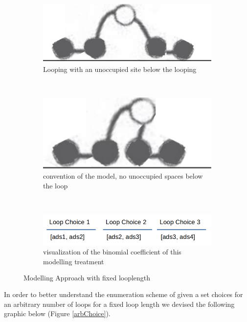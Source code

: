 \documentclass[10pt,letterpaper]{article}
\begin{document}
\begin{figure}[H]
	\centering
	\begin{subfigure}[b]{0.65\textwidth}
		\centering
		\includegraphics[scale=0.4]{loopnorm.png}
		\caption{Looping with an unoccupied site below the looping}
		\label{loop and train}
		\end{subfigure}\\
		\begin{subfigure}[b]{0.7\textwidth}
			\centering
			\includegraphics[scale=0.4]{loopsquished.pdf}
			\caption{convention of the model, no unoccupied spaces below the loop}
			\label{loop and train}
		\end{subfigure}\\
		\begin{subfigure}[b]{0.75\textwidth}
			\centering
			\includegraphics[scale=0.45]{loopschoices.png}
			\caption{visualization of the binomial coefficient of this modelling treatment}
			\label{loop}
	\end{subfigure}
	\caption{Modelling Approach with fixed looplength}
\end{figure}

\noindent In order to better understand the enumeration scheme of given a set choices for an arbitrary number of loops for a fixed loop length we devised the following graphic below (Figure \ref{arbChoice}).
\end{document}
